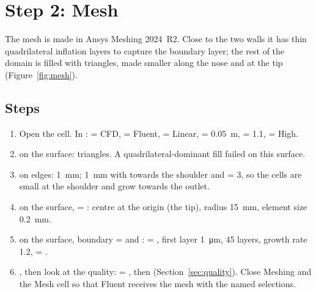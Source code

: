 \section{Step 2: Mesh}
\label{sec:mesh}

The mesh is made in Ansys Meshing 2024~R2. Close to the two walls it has thin quadrilateral inflation
layers to capture the boundary layer; the rest of the domain is filled with triangles, made smaller
along the nose and at the tip (Figure~\ref{fig:mesh}).

\subsection{Steps}

\begin{enumerate}
\item Open the  cell. In \then{}:  = CFD,
 = Fluent,  = Linear,  = \SI{0.05}{m},
 = 1.1,  = High.
\item {}\then{} on the surface: triangles. A quadrilateral-dominant fill failed on
this surface.
\item {}\then{} on edges:  \SI{1}{mm}; 
\SI{1}{mm} with  towards the shoulder and  = 3, so the cells are small at
the shoulder and grow towards the outlet.
\item {}\then{} on the surface,  = : centre at
the origin (the tip), radius \SI{15}{mm}, element size \SI{0.2}{mm}.
\item {}\then{} on the surface, boundary =  and
:  = , first layer
\SI{1}{\micro m}, 45 layers, growth rate 1.2,  = .
\item {}, then look at the quality: \then{}\then{} =
, then  (Section~\ref{sec:quality}). Close Meshing and
 the Mesh cell so that Fluent receives the mesh with the named selections.
\end{enumerate}


